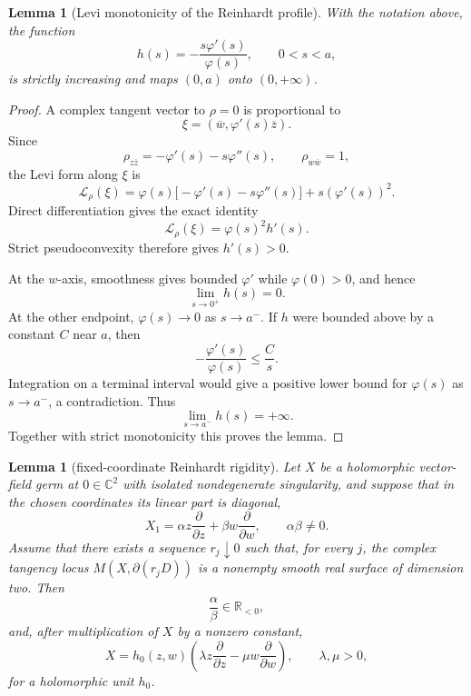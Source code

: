 \documentclass[11pt,reqno]{article}
\newtheorem{lemma}[theorem]{Lemma}
\theoremstyle{remark}
\newcommand{\C}{\mathbb C}
\newcommand{\R}{\mathbb R}
\newcommand{\pd}{\partial}
\newcommand{\ol}{\overline}
\begin{document}
\begin{lemma}[Levi monotonicity of the Reinhardt profile]\label{lem:reinhardt-profile}
With the notation above, the function
\[
 h(s)=-\frac{s\varphi'(s)}{\varphi(s)},\qquad 0<s<a,
\]
is strictly increasing and maps $(0,a)$ onto $(0,+\infty)$.
\end{lemma}

\begin{proof}
A complex tangent vector to $\rho=0$ is proportional to
\[
 \xi=(\ol w,\varphi'(s)\ol z).
\]
Since
\[
 \rho_{z\ol z}=-\varphi'(s)-s\varphi''(s),
 \qquad
 \rho_{w\ol w}=1,
\]
the Levi form along $\xi$ is
\[
 \mathcal L_\rho(\xi)
 =\varphi(s)\bigl[-\varphi'(s)-s\varphi''(s)\bigr]
   +s(\varphi'(s))^2.
\]
Direct differentiation gives the exact identity
\begin{equation}\label{eq:levi-h}
 \mathcal L_\rho(\xi)=\varphi(s)^2h'(s).
\end{equation}
Strict pseudoconvexity therefore gives $h'(s)>0$.

At the $w$-axis, smoothness gives bounded $\varphi'$ while $\varphi(0)>0$, and hence
\[
 \lim_{s\to0^+}h(s)=0.
\]
At the other endpoint, $\varphi(s)\to0$ as $s\to a^-$. If $h$ were bounded above by a constant $C$ near $a$, then
\[
 -\frac{\varphi'(s)}{\varphi(s)}\leq\frac{C}{s}.
\]
Integration on a terminal interval would give a positive lower bound for $\varphi(s)$ as $s\to a^-$, a contradiction. Thus
\[
 \lim_{s\to a^-}h(s)=+\infty.
\]
Together with strict monotonicity this proves the lemma.
\end{proof}

\begin{lemma}[fixed-coordinate Reinhardt rigidity]\label{lem:reinhardt-rigidity}
Let $X$ be a holomorphic vector-field germ at $0\in\C^2$ with isolated nondegenerate singularity, and suppose that in the chosen coordinates its linear part is diagonal,
\[
 X_1=\alpha z\frac{\pd}{\pd z}+\beta w\frac{\pd}{\pd w},
 \qquad \alpha\beta\ne0.
\]
Assume that there exists a sequence $r_j\downarrow0$ such that, for every $j$, the complex tangency locus $M(X,\partial(r_jD))$ is a nonempty smooth real surface of dimension two. Then
\[
 \frac{\alpha}{\beta}\in\R_{<0},
\]
and, after multiplication of $X$ by a nonzero constant,
\[
 X=h_0(z,w)\left(
 \lambda z\frac{\pd}{\pd z}-\mu w\frac{\pd}{\pd w}
 \right),
 \qquad \lambda,\mu>0,
\]
for a holomorphic unit $h_0$.
\end{lemma}
\end{document}
